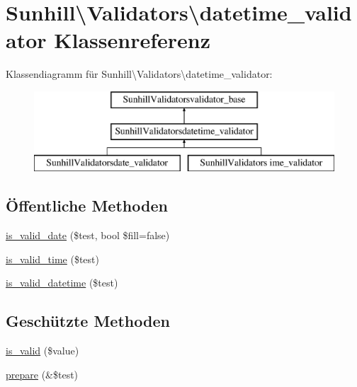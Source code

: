 \hypertarget{classSunhill_1_1Validators_1_1datetime__validator}{}\section{Sunhill\textbackslash{}Validators\textbackslash{}datetime\+\_\+validator Klassenreferenz}
\label{classSunhill_1_1Validators_1_1datetime__validator}
Klassendiagramm für Sunhill\textbackslash{}Validators\textbackslash{}datetime\+\_\+validator\+:\begin{figure}[H]
\begin{center}
\leavevmode
\includegraphics[height=3.000000cm]{d0/d0c/classSunhill_1_1Validators_1_1datetime__validator}
\end{center}
\end{figure}
\subsection*{Öffentliche Methoden}
\begin{DoxyCompactItemize}
\item 
\hyperlink{classSunhill_1_1Validators_1_1datetime__validator_a3e25ea0036553a6a04bbea63e3be75b7}{is\+\_\+valid\+\_\+date} (\$test, bool \$fill=false)
\item 
\hyperlink{classSunhill_1_1Validators_1_1datetime__validator_a53b701e2d7a3809802bc36eac382a664}{is\+\_\+valid\+\_\+time} (\$test)
\item 
\hyperlink{classSunhill_1_1Validators_1_1datetime__validator_aab19aedb2eeed80c1dcd152c8788419a}{is\+\_\+valid\+\_\+datetime} (\$test)
\end{DoxyCompactItemize}
\subsection*{Geschützte Methoden}
\begin{DoxyCompactItemize}
\item 
\hyperlink{classSunhill_1_1Validators_1_1datetime__validator_a888606111352ba937de39c4db3a74ce3}{is\+\_\+valid} (\$value)
\item 
\hyperlink{classSunhill_1_1Validators_1_1datetime__validator_a5b54836463c37a14eb5f74286725226e}{prepare} (\&\$test)
\end{DoxyCompactItemize}


